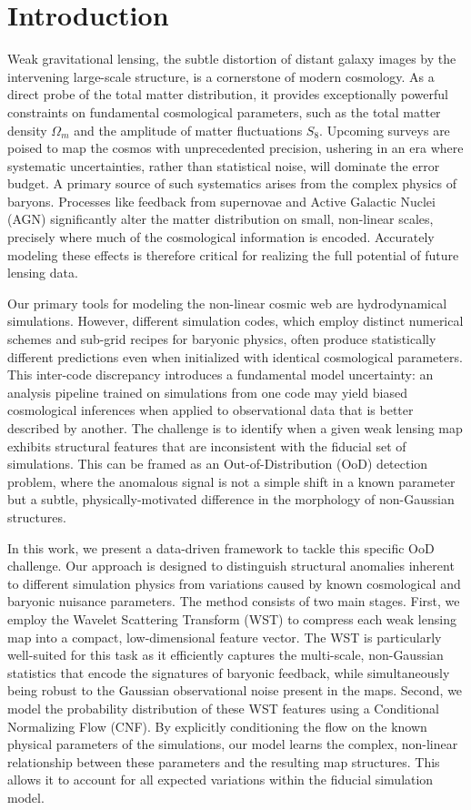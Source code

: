 \documentclass[]{article}
\begin{document}
\section{Introduction}
\label{sec:intro}
Weak gravitational lensing, the subtle distortion of distant galaxy images by the intervening large-scale structure, is a cornerstone of modern cosmology. As a direct probe of the total matter distribution, it provides exceptionally powerful constraints on fundamental cosmological parameters, such as the total matter density $\Omega_m$ and the amplitude of matter fluctuations $S_8$. Upcoming surveys are poised to map the cosmos with unprecedented precision, ushering in an era where systematic uncertainties, rather than statistical noise, will dominate the error budget. A primary source of such systematics arises from the complex physics of baryons. Processes like feedback from supernovae and Active Galactic Nuclei (AGN) significantly alter the matter distribution on small, non-linear scales, precisely where much of the cosmological information is encoded. Accurately modeling these effects is therefore critical for realizing the full potential of future lensing data.

Our primary tools for modeling the non-linear cosmic web are hydrodynamical simulations. However, different simulation codes, which employ distinct numerical schemes and sub-grid recipes for baryonic physics, often produce statistically different predictions even when initialized with identical cosmological parameters. This inter-code discrepancy introduces a fundamental model uncertainty: an analysis pipeline trained on simulations from one code may yield biased cosmological inferences when applied to observational data that is better described by another. The challenge is to identify when a given weak lensing map exhibits structural features that are inconsistent with the fiducial set of simulations. This can be framed as an Out-of-Distribution (OoD) detection problem, where the anomalous signal is not a simple shift in a known parameter but a subtle, physically-motivated difference in the morphology of non-Gaussian structures.

In this work, we present a data-driven framework to tackle this specific OoD challenge. Our approach is designed to distinguish structural anomalies inherent to different simulation physics from variations caused by known cosmological and baryonic nuisance parameters. The method consists of two main stages. First, we employ the Wavelet Scattering Transform (WST) to compress each weak lensing map into a compact, low-dimensional feature vector. The WST is particularly well-suited for this task as it efficiently captures the multi-scale, non-Gaussian statistics that encode the signatures of baryonic feedback, while simultaneously being robust to the Gaussian observational noise present in the maps. Second, we model the probability distribution of these WST features using a Conditional Normalizing Flow (CNF). By explicitly conditioning the flow on the known physical parameters of the simulations, our model learns the complex, non-linear relationship between these parameters and the resulting map structures. This allows it to account for all expected variations within the fiducial simulation model.
\end{document}
